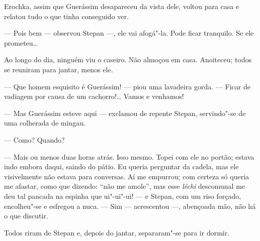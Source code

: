 Erochka, assim que Guerássim desapareceu da vista dele, voltou para casa
e relatou tudo o que tinha conseguido ver.

--- Pois bem --- observou Stepan ---, ele vai afogá"-la. Pode ficar
tranquilo. Se ele prometeu\ldots{}

Ao longo do dia, ninguém viu o caseiro. Não almoçou em casa. Anoiteceu;
todos se reuniram para jantar, menos ele.

--- Que homem esquisito é Guerássim! --- piou uma lavadeira gorda. ---
Ficar de vadiagem por causa de um cachorro!\ldots{} Vamos e venhamos!

--- Mas Guerássim esteve aqui --- exclamou de repente Stepan,
servindo"-se de uma colherada de mingau.

--- Como? Quando?

--- Mais ou menos duas horas atrás. Isso mesmo. Topei com ele no portão;
estava indo embora daqui, saindo do pátio. Eu queria perguntar da
cadela, mas ele visivelmente não estava para conversas. Aí me empurrou;
com certeza só queria me afastar, como que dizendo: ``não me amole'',
mas esse \emph{léchi} descomunal me deu tal pancada na espinha que
ui"-ui"-ui! --- e Stepan, com um riso forçado, encolheu"-se e esfregou a
nuca. --- Sim --- acrescentou ---, abençoada mão, não há o que discutir.

Todos riram de Stepan e, depois do jantar, separaram"-se para ir dormir.

